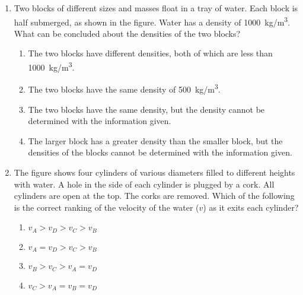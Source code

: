 \documentclass{../../oss-apphys}
\begin{document}
\genheader


\genmultidirections

\gengravity

\raggedcolumns
\begin{multicols}{2}

  \begin{enumerate}[leftmargin=18pt]

  \item Two blocks of different sizes and masses float in a tray of water. Each
    block is half submerged, as shown in the figure. Water has a density of
    \SI{1000}{kg/m^3}. What can be concluded about the densities of the two
    blocks?
    
    \begin{enumerate}[noitemsep,topsep=0pt,leftmargin=18pt,label=(\Alph*)]
    \item\vspace{-.1in} The two blocks have different densities, both of which
      are less than \SI{1000}{kg/m^3}.
    \item The two blocks have the same density of \SI{500}{kg/m^3}.
    \item The two blocks have the same density, but the density cannot be
      determined with the information given.
    \item The larger block has a greater density than the smaller block, but
      the densities of the blocks cannot be determined with the information
      given.
    \end{enumerate}

  \item The figure shows four cylinders of various diameters filled to different
    heights with water. A hole in the side of each cylinder is plugged by a
    cork. All cylinders are open at the top. The corks are removed. Which
    of the following is the correct ranking of the velocity of the water ($v$)
    as it exits each cylinder?
    
    \begin{enumerate}[noitemsep,topsep=0pt,leftmargin=18pt,label=(\Alph*)]
    \item $v_A > v_D > v_C > v_B$
    \item $v_A = v_D > v_C > v_B$
    \item $v_B > v_C > v_A = v_D$
    \item $v_C > v_A = v_B = v_D$
    \end{enumerate}
  \end{enumerate}
  

\end{multicols}
\end{document}
